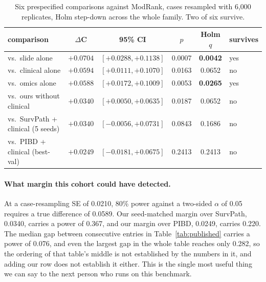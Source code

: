 \documentclass[11pt]{article}
\begin{document}
\begin{table}[t]
\centering
\caption{Six prespecified comparisons against ModRank, cases resampled with 6{,}000 replicates,
Holm step-down across the whole family. Two of six survive.}
\label{tab:holm}
{\small
\begin{tabular}{lccccl}
\toprule
comparison & $\Delta$C & 95\% CI & $p$ & Holm $q$ & survives \\
\midrule
vs.\ slide alone                  & $+0.0704$ & $[+0.0288, +0.1138]$ & 0.0007 & \textbf{0.0042} & yes \\
vs.\ clinical alone               & $+0.0594$ & $[+0.0111, +0.1070]$ & 0.0163 & 0.0652 & no \\
vs.\ omics alone                  & $+0.0588$ & $[+0.0172, +0.1009]$ & 0.0053 & \textbf{0.0265} & yes \\
vs.\ ours without clinical        & $+0.0340$ & $[+0.0050, +0.0635]$ & 0.0187 & 0.0652 & no \\
vs.\ SurvPath + clinical (5 seeds) & $+0.0340$ & $[-0.0056, +0.0731]$ & 0.0843 & 0.1686 & no \\
vs.\ PIBD + clinical (best-val)   & $+0.0249$ & $[-0.0181, +0.0675]$ & 0.2413 & 0.2413 & no \\
\bottomrule
\end{tabular}}
\end{table}

\paragraph{What margin this cohort could have detected.} At a case-resampling SE of 0.0210, 80\%
power against a two-sided $\alpha$ of 0.05 requires a true difference of 0.0589. Our
seed-matched margin over SurvPath, 0.0340, carries a power of 0.367, and our margin over PIBD,
0.0249, carries 0.220. The median gap between consecutive entries in
Table~\ref{tab:published} carries a power of 0.076, and even the largest gap in the whole table
reaches only 0.282, so the ordering of that
table's middle is not established by the numbers in it, and adding our row does not establish it
either. This is the single most useful thing we can say to the next person who runs on this
benchmark.
\end{document}

